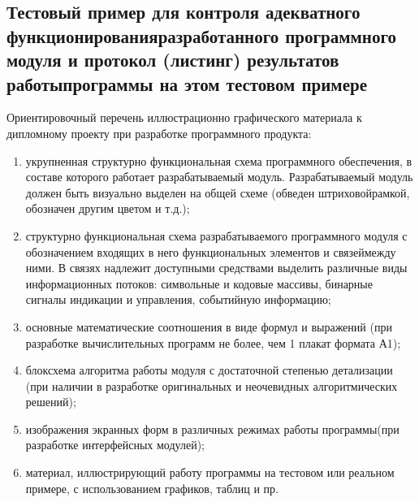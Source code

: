 \subsection{Тестовый пример для контроля адекватного функционированияразработанного программного модуля и протокол (листинг) результатов работыпрограммы на этом тестовом примере}

Ориентировочный перечень иллюстрационно графического материала к дипломному проекту при разработке программного продукта:
\begin{enumerate}
\item  укрупненная структурно функциональная схема программного обеспечения, в составе которого работает разрабатываемый модуль. Разрабатываемый модуль должен быть визуально выделен на общей схеме (обведен штриховойрамкой, обозначен другим цветом и т.д.);
\item  структурно функциональная схема разрабатываемого программного модуля с обозначением входящих в него функциональных элементов и связеймежду ними. В связях надлежит доступными средствами выделить различные виды информационных потоков: символьные и кодовые массивы, бинарные сигналы индикации и управления, событийную информацию;
\item  основные математические соотношения в виде формул и выражений (при разработке вычислительных программ не более, чем 1 плакат формата А1);
\item  блоксхема алгоритма работы модуля с достаточной степенью детализации (при наличии в разработке оригинальных и неочевидных алгоритмических решений);
\item  изображения экранных форм в различных режимах работы программы(при разработке интерфейсных модулей);
\item  материал, иллюстрирующий работу программы на тестовом или реальном примере, с использованием графиков, таблиц и пр.
\end{enumerate}
